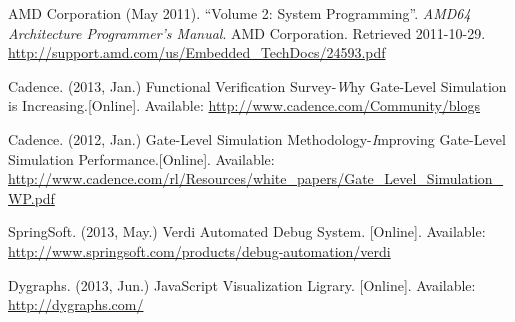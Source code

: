 \begin{thebibliography}{10}
\BIBentryALTinterwordspacing
AMD Corporation (May 2011). ``Volume 2: System Programming''. \emph{AMD64 Architecture Programmer's Manual}. AMD Corporation. Retrieved 2011-10-29.
\url{http://support.amd.com/us/Embedded_TechDocs/24593.pdf}
\BIBentrySTDinterwordspacing
 
\BIBentryALTinterwordspacing
Cadence. (2013, Jan.) {Functional Verification Survey-{\emph Why Gate-Level Simulation is Increasing}}.[Online]. Available:
\url {http://www.cadence.com/Community/blogs}
\BIBentrySTDinterwordspacing

\BIBentryALTinterwordspacing
Cadence. (2012, Jan.) {Gate-Level Simulation Methodology-{\emph Improving Gate-Level Simulation Performance}}.[Online]. Available:
\url {http://www.cadence.com/rl/Resources/white_papers/Gate_Level_Simulation_WP.pdf}
\BIBentrySTDinterwordspacing


\BIBentryALTinterwordspacing
SpringSoft. (2013, May.) {Verdi Automated Debug System}. [Online]. Available:
  \url{http://www.springsoft.com/products/debug-automation/verdi}
\BIBentrySTDinterwordspacing

\BIBentryALTinterwordspacing
Dygraphs. (2013, Jun.) {JavaScript Visualization Ligrary}. [Online]. Available:
  \url{http://dygraphs.com/}
\BIBentrySTDinterwordspacing

%
%
%
%
%
%

\end{thebibliography}
